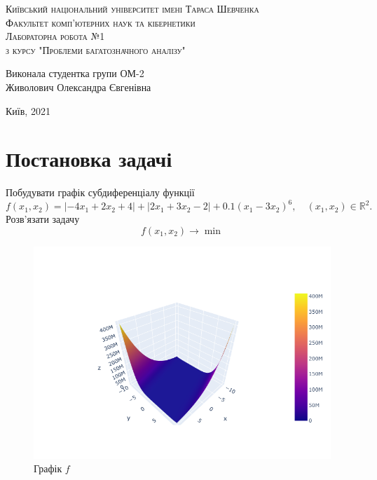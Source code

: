 \documentclass[a4paper, 14pt]{extarticle}
\begin{document}
\begin{center}
    \vspace*{\fill}
    \textsc{Київський національний університет імені Тараса Шевченка}\\
    \textsc{Факультет комп'ютерних наук та кібернетики}\\
    \vspace*{\fill}
    \textsc{Лабораторна робота №1}\\
    \textsc{з курсу "Проблеми багатозначного аналізу"}\\
    \vspace*{\fill}
    \begin{flushright}
        Виконала студентка групи ОМ-2\\
        Живолович Олександра Євгенівна\\
    \end{flushright}
    \vspace*{\fill}
    Київ, 2021
\end{center}
\thispagestyle{empty}

\newpage
\thispagestyle{empty}
\tableofcontents
\newpage

\section{Постановка задачі}
Побудувати графік субдиференціалу функції 
\begin{equation}
f(x_1,x_2) = |-4x_1+2x_2+4| + |2x_1+3x_2-2| + 0.1(x_1-3x_2)^6, \quad (x_1,x_2) \in \mathbb{R}^2.
\end{equation}
Розв'язати задачу 
\begin{equation}
    f(x_1,x_2) \to\min
\end{equation}
\begin{figure}[h]
    \centering
    \caption{Графік $f$}
    \includegraphics[width = \textwidth]{objective.png}
\end{figure}
\end{document}
